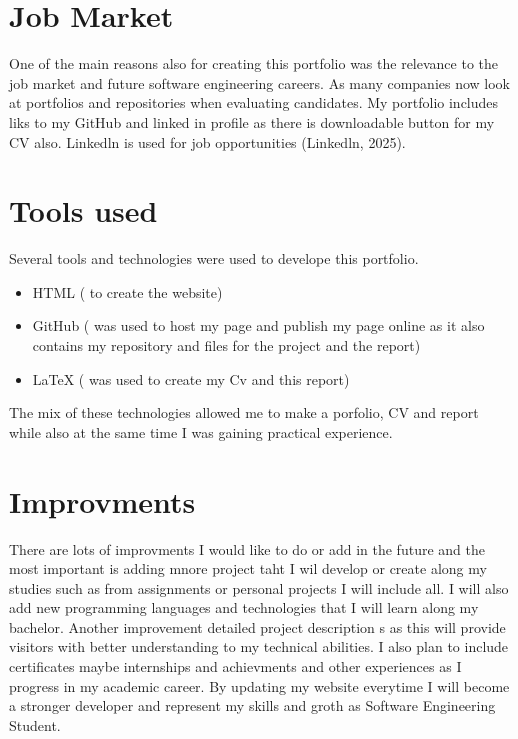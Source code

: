 \documentclass[12pt]{article}
\begin{document}
\section*{Job Market}
One of the main reasons also for creating this portfolio was the relevance to the job market and future software engineering careers. As many companies now look at portfolios and repositories when evaluating candidates. My portfolio includes liks to my GitHub and linked in profile as there is downloadable button for my CV also. Linkedln is used for job opportunities (Linkedln, 2025).

\section*{Tools used}
Several tools and technologies were used to develope this portfolio.
\begin{itemize}
    \item HTML ( to create the website)
    \item GitHub ( was used to host my page and publish my page online as it also contains my repository and files for the project and the report)
    \item LaTeX ( was used to create my Cv and this report)
    
\end{itemize}
 The mix of these technologies allowed me to make a porfolio, CV and report while also at the same time I was gaining practical experience.
 

\section*{Improvments}
There are lots of improvments I would like to do or add in the future and the most important is adding mnore project taht I wil develop or create along my studies such as from assignments or personal projects I will include all. I will also add new programming languages and technologies that I will learn along my bachelor. Another improvement detailed project description s as this will provide visitors with better understanding to my technical abilities. I also plan to include certificates maybe internships and achievments and other experiences as I progress in my academic career. By updating my website everytime I will become a stronger developer and represent my skills and groth as Software Engineering Student.
\end{document}
